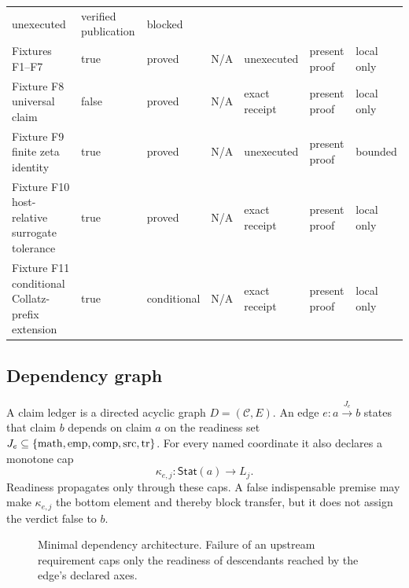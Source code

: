 \documentclass[11pt,a4paper]{article}
\theoremstyle{definition}
\theoremstyle{plain}
\theoremstyle{remark}
\newcommand{\Stat}{\mathsf{Stat}}
\begin{document}
\begin{table}[htbp]
\begin{tabularx}{\textwidth}{L{0.20\textwidth}L{0.085\textwidth}L{0.09\textwidth}L{0.10\textwidth}L{0.11\textwidth}L{0.13\textwidth}Y}
unexecuted & verified publication & blocked\\
Fixtures F1--F7 & true & proved & N/A & unexecuted & present proof & local only\\
Fixture F8 universal claim & false & proved & N/A & exact receipt & present proof &
local only\\
Fixture F9 finite zeta identity & true & proved & N/A & unexecuted & present proof &
bounded\\
Fixture F10 host-relative surrogate tolerance & true & proved & N/A &
exact receipt & present proof & local only\\
Fixture F11 conditional Collatz-prefix extension & true & conditional &
N/A & exact receipt & present proof & local only\\
\bottomrule
\end{tabularx}
\end{table}

\subsection{Dependency graph}

A claim ledger is a directed acyclic graph \(D=(\mathcal C,E)\).  An edge
\(e:a\xrightarrow{J_e}b\) states that claim \(b\) depends on claim \(a\) on
the readiness set
\(J_e\subseteq\{\rm math,emp,comp,src,tr\}\).  For every named coordinate it
also declares a monotone cap
\[
\kappa_{e,j}:\Stat(a)\longrightarrow L_j.
\]
Readiness propagates only through these caps.  A false indispensable premise
may make \(\kappa_{e,j}\) the bottom element and thereby block transfer, but it
does not assign the verdict false to \(b\).

\begin{figure}[htbp]
\centering
{}
\caption{Minimal dependency architecture.  Failure of an upstream requirement
caps only the readiness of descendants reached by the edge's declared axes.}
\label{fig:dag}
\end{figure}
\end{document}
